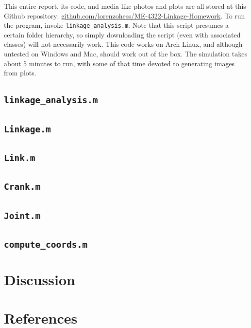 \documentclass[12pt]{article}
\begin{document}
This entire report, its code, and media like photos and plots are all stored at this Github repository: \href{https://github.com/lorenzohess/ME-4322-Linkage-Homework}{github.com/lorenzohess/ME-4322-Linkage-Homework}. To run the program, invoke \texttt{linkage\_analysis.m}. Note that this script presumes a certain folder hierarchy, so simply downloading the script (even with associated classes) will not necessarily work. This code works on Arch Linux, and although untested on Windows and Mac, should work out of the box. The simulation takes about 5 minutes to run, with some of that time devoted to generating images from plots.

\subsection{\texttt{linkage\_analysis.m}}%

\subsection{\texttt{Linkage.m}}%

\subsection{\texttt{Link.m}}%

\subsection{\texttt{Crank.m}}%

\subsection{\texttt{Joint.m}}%

\subsection{\texttt{compute\_coords.m}}%

\section{Discussion}%
\label{discuss}

\section{References}%
\label{ref}
\end{document}
